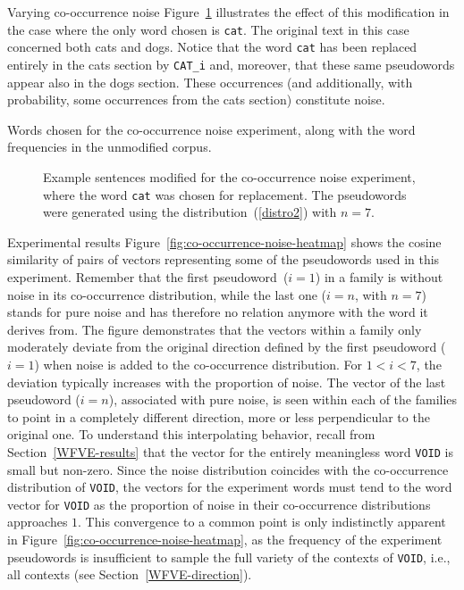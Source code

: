 \documentclass{article} %
\newcommand{\word}[1]{\texttt{#1}}
\begin{document}
\begin{section}{Varying co-occurrence noise}
Figure~\ref{fig:co-occurrence-noise-experiment-text} illustrates the
effect of this modification in the case where the only word chosen is
\word{cat}.  The original text in this case concerned both cats and
dogs.  Notice that the word \word{cat} has been replaced entirely in the
cats section by \word{CAT\_i} and, moreover, that these same pseudowords
appear also in the dogs section. These occurrences (and additionally,
with probability, some occurrences from the cats section) constitute
noise.

\begin{table}
	
	\label{fig:co-occurrence-noise-counts}
	\caption{Words chosen for the co-occurrence noise experiment,
          along with the word frequencies in the unmodified corpus. }
	\label{cooccurrence-noise-words}
\end{table}

\begin{figure}
	\begin{mdframed}
	
	\end{mdframed}
	\caption{Example sentences modified for the co-occurrence noise
          experiment, where the word \word{cat} was chosen for
          replacement.  The pseudowords were generated using the
          distribution~(\ref{distro2}) with $n=7$.}
	\label{fig:co-occurrence-noise-experiment-text}
\end{figure}

\begin{subsection}{Experimental results}
%
Figure~\ref{fig:co-occurrence-noise-heatmap} shows the cosine similarity
of pairs of vectors representing some of the pseudowords used in this
experiment.  Remember that the first pseudoword~($i=1$) in a family is
without noise in its co-occurrence distribution, while the last one
($i=n$, with $n=7$) stands for pure noise and has therefore no relation
anymore with the word it derives from.  The figure demonstrates that the
vectors within a family only moderately deviate from the original
direction defined by the first pseudoword ($i=1$) when noise is added to the
co-occurrence distribution.  For $1<i<7$, the deviation typically
increases with the proportion of noise.  The vector of the last pseudoword
($i=n$), associated with pure noise, is seen within each of the families
to point in a completely different direction, more or less perpendicular
to the original one.  To understand this interpolating behavior, recall
from Section~\ref{WFVE-results} that the vector for the entirely
meaningless word \word{VOID} is small but non-zero.  Since the noise
distribution coincides with the co-occurrence distribution of
\word{VOID}, the vectors for the experiment words must tend to the word
vector for \word{VOID} as the proportion of noise in their co-occurrence
distributions approaches $1$.
This convergence to a common point is only indistinctly apparent in
Figure~\ref{fig:co-occurrence-noise-heatmap}, as the frequency of the experiment
pseudowords is insufficient to sample the full variety of the contexts of
\word{VOID}, i.e., all contexts (see Section~\ref{WFVE-direction}).


\end{subsection}
\end{section}
\end{document}

